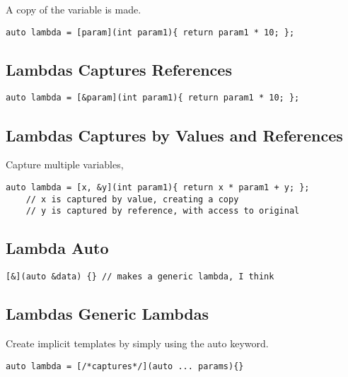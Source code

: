 A copy of the variable is made.

\begin{verbatim}
auto lambda = [param](int param1){ return param1 * 10; };
\end{verbatim}

\subsection{Lambdas Captures References}

\begin{verbatim}
auto lambda = [&param](int param1){ return param1 * 10; };
\end{verbatim}

\subsection{Lambdas Captures by Values and References}

Capture multiple variables, 

\begin{verbatim}
auto lambda = [x, &y](int param1){ return x * param1 + y; };
    // x is captured by value, creating a copy
    // y is captured by reference, with access to original
\end{verbatim}

\subsection{Lambda Auto}

\begin{verbatim}
[&](auto &data) {} // makes a generic lambda, I think
\end{verbatim}

\subsection{Lambdas Generic Lambdas}

Create implicit templates by simply using the auto keyword.

\begin{verbatim}
auto lambda = [/*captures*/](auto ... params){}
\end{verbatim}

